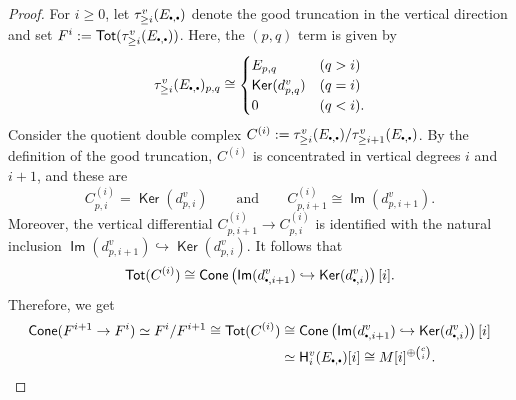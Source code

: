 \documentclass[10pt, a4paper,reqno]{amsart}
\theoremstyle{definition}
\theoremstyle{remark}
\numberwithin{equation}{thm}
\def\sH{\mathsf{H}}
\def\Ker{\operatorname{\mathsf{Ker}}}
\def\Im{\operatorname{\mathsf{Im}}}
\def\Tot{\operatorname{\mathsf{Tot}}}
\def\Cone{\mathsf{Cone}}
\newcommand{\mdot}{%
  \mathbin{\vcenter{\hbox{\scalebox{0.5}{$\bullet$}}}}%
}
\begin{document}
\begin{proof}
For $i\geq0$, let $\tau_{\geq i}^v(E_{\mdot,\mdot})$ denote the good truncation in the vertical direction and set $F^i := \Tot(\tau_{\geq i}^v(E_{\mdot,\mdot}))$. 
Here, the $(p,q)$ term is given by
\[
\tau_{\ge i}^v(E_{\mdot,\mdot})_{p,q} \cong 
\begin{cases}
E_{p,q} & (q > i) \\
\Ker(d^v_{p,q}) & (q=i) \\
0 & (q < i).	
\end{cases}
\] 
Consider the quotient double complex $C^{(i)} :=\tau_{\ge i}^v(E_{\mdot,\mdot})/\tau_{\ge i+1}^v(E_{\mdot,\mdot})$.
By the definition of the good truncation, $C^{(i)}$ is concentrated in vertical degrees $i$ and $i+1$, and these are
\[
C^{(i)}_{p,i}
=
\Ker(d^v_{p,i})
\qquad\text{and}\qquad
C^{(i)}_{p,i+1}
\cong
\Im(d^v_{p,i+1}).
\]
Moreover, the vertical differential $C^{(i)}_{p,i+1} \to C^{(i)}_{p,i}$ is identified with the natural inclusion $\Im(d^v_{p,i+1}) \hookrightarrow \Ker(d^v_{p,i})$.
It follows that
\[
\Tot(C^{(i)})
\cong
\Cone\left(
\Im(d^v_{\mdot,i+1})
\hookrightarrow
\Ker(d^v_{\mdot,i})
\right)[i].
\]
Therefore, we get
\begin{align*}
\Cone(F^{i+1} \to F^i) \simeq F^i/F^{i+1} \cong \Tot(C^{(i)}) 
&\cong 
\Cone\left(
\Im(d^v_{\mdot,i+1})
\hookrightarrow
\Ker(d^v_{\mdot,i})
\right)[i] \\
&\simeq \sH_i^v(E_{\mdot,\mdot})[i] 
\cong M[i]^{\oplus \binom{c}{i}}.	
\end{align*}


\end{proof}
\end{document}
